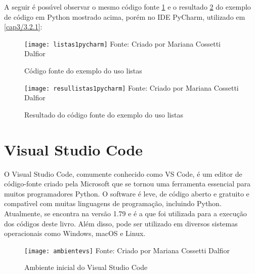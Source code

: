 A seguir \'{e} poss\'{\i}vel observar o mesmo c\'{o}digo fonte \ref{fontelista} e o resultado \ref{resullista} do exemplo de c\'{o}digo em Python mostrado acima, por\'{e}m no IDE PyCharm, utilizado em \ref{cap3/3.2.1}:

\begin{figure}[H]
	\begin{center}
		\caption{C\'{o}digo fonte do exemplo do uso listas} \label{fontelista}
		\texttt{[image: listas1pycharm]} 
		\newline
		Fonte: Criado por Mariana Cossetti Dalfior
	\end{center}
\end{figure}

\begin{figure}[H]
	\begin{center}
		\caption{Resultado do c\'{o}digo fonte do exemplo do uso listas} \label{resullista}
		\texttt{[image: resullistas1pycharm]} 
		\newline
		Fonte: Criado por Mariana Cossetti Dalfior
	\end{center}
\end{figure}

    \section{Visual Studio Code}
O Visual Studio Code, comumente conhecido como VS Code, \'{e} um editor de c\'{o}digo-fonte criado pela Microsoft que se tornou uma ferramenta essencial para muitos programadores Python. O software \'{e} leve, de c\'{o}digo aberto e gratuito e compat\'{\i}vel com muitas linguagens de programa\c{c}\~{a}o, incluindo Python. Atualmente, se encontra na vers\~{a}o 1.79 e \'{e} a que foi utilizada para a execu\c{c}\~{a}o dos c\'{o}digos deste livro. Al\'{e}m disso, pode ser utilizado em diversos sistemas operacionais como Windows, macOS e Linux. 

\begin{figure}[H]
	\begin{center}
		\caption{Ambiente inicial do Visual Studio Code} \label{ambientevs}
		\texttt{[image: ambientevs]} 
		\newline
		Fonte: Criado por Mariana Cossetti Dalfior
	\end{center}
\end{figure}

